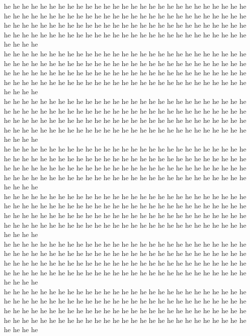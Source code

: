 he he he he he he he he he he he he he he he he he he he he he he he he he he he he he he he he he he he he he he he he he he he he he he he he he he he he he he he he he he he he he he he he he he he he he he he he he he he he he he he he he he he he he he he he he he he he he he he he he he he he he he he he he he he he he he he he\\
he he he he he he he he he he he he he he he he he he he he he he he he he he he he he he he he he he he he he he he he he he he he he he he he he he he he he he he he he he he he he he he he he he he he he he he he he he he he he he he he he he he he he he he he he he he he he he he he he he he he he he he he he he he he he he he he\\
he he he he he he he he he he he he he he he he he he he he he he he he he he he he he he he he he he he he he he he he he he he he he he he he he he he he he he he he he he he he he he he he he he he he he he he he he he he he he he he he he he he he he he he he he he he he he he he he he he he he he he he he he he he he he he he he\\
he he he he he he he he he he he he he he he he he he he he he he he he he he he he he he he he he he he he he he he he he he he he he he he he he he he he he he he he he he he he he he he he he he he he he he he he he he he he he he he he he he he he he he he he he he he he he he he he he he he he he he he he he he he he he he he he\\
he he he he he he he he he he he he he he he he he he he he he he he he he he he he he he he he he he he he he he he he he he he he he he he he he he he he he he he he he he he he he he he he he he he he he he he he he he he he he he he he he he he he he he he he he he he he he he he he he he he he he he he he he he he he he he he he\\
he he he he he he he he he he he he he he he he he he he he he he he he he he he he he he he he he he he he he he he he he he he he he he he he he he he he he he he he he he he he he he he he he he he he he he he he he he he he he he he he he he he he he he he he he he he he he he he he he he he he he he he he he he he he he he he he\\
he he he he he he he he he he he he he he he he he he he he he he he he he he he he he he he he he he he he he he he he he he he he he he he he he he he he he he he he he he he he he he he he he he he he he he he he he he he he he he he he he he he he he he he he he he he he he he he he he he he he he he he he he he he he he he he he\\
